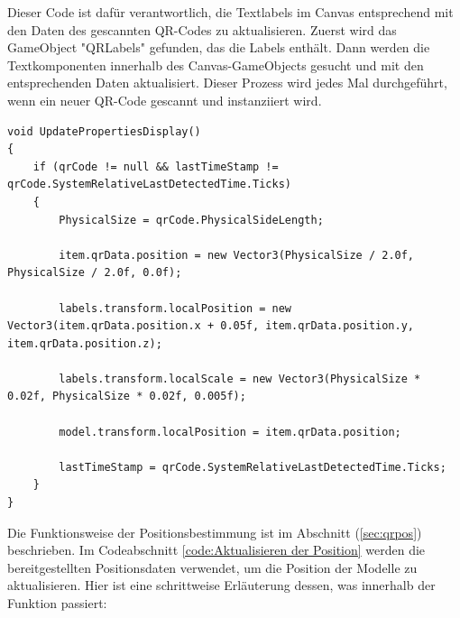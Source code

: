 Dieser Code ist dafür verantwortlich, die Textlabels im Canvas entsprechend mit den Daten des gescannten QR-Codes zu aktualisieren. Zuerst wird das GameObject "QRLabels" gefunden, das die Labels enthält. Dann werden die Textkomponenten innerhalb des Canvas-GameObjects gesucht und mit den entsprechenden Daten aktualisiert. Dieser Prozess wird jedes Mal durchgeführt, wenn ein neuer QR-Code gescannt und instanziiert wird.


\begin{lstlisting}[style=csharp, caption={Aktualisieren der Position}, label=code:Aktualisieren der Position]
void UpdatePropertiesDisplay()
{
    if (qrCode != null && lastTimeStamp != qrCode.SystemRelativeLastDetectedTime.Ticks)
    {
        PhysicalSize = qrCode.PhysicalSideLength;

        item.qrData.position = new Vector3(PhysicalSize / 2.0f, PhysicalSize / 2.0f, 0.0f);

        labels.transform.localPosition = new Vector3(item.qrData.position.x + 0.05f, item.qrData.position.y, item.qrData.position.z);

        labels.transform.localScale = new Vector3(PhysicalSize * 0.02f, PhysicalSize * 0.02f, 0.005f);

        model.transform.localPosition = item.qrData.position;

        lastTimeStamp = qrCode.SystemRelativeLastDetectedTime.Ticks;
    }
}
\end{lstlisting}
Die Funktionsweise der Positionsbestimmung ist im Abschnitt (\ref{sec:qrpos}) beschrieben. Im Codeabschnitt \ref{code:Aktualisieren der Position} werden die bereitgestellten Positionsdaten verwendet, um die Position der Modelle zu aktualisieren. Hier ist eine schrittweise Erläuterung dessen, was innerhalb der Funktion passiert:
